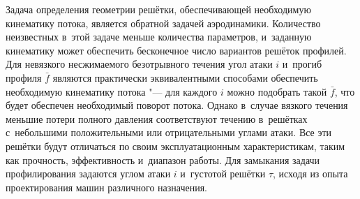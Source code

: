 Задача определения геометрии решётки, обеспечивающей необходимую кинематику потока, является обратной задачей аэродинамики.
Количество неизвестных в~этой задаче меньше количества параметров, и~заданную кинематику может обеспечить бесконечное число вариантов решёток профилей.
Для невязкого несжимаемого безотрывного течения угол атаки \(i\) и~прогиб профиля \(\bar{f}\) являются практически эквивалентными способами обеспечить необходимую кинематику потока "--- для каждого \(i\) можно подобрать такой \(\bar{f}\), что будет обеспечен необходимый поворот потока.
Однако в~случае вязкого течения меньшие потери полного давления соответствуют течению в~решётках с~небольшими положительными или отрицательными углами атаки.
Все эти решётки будут отличаться по своим эксплуатационным характеристикам, таким как прочность, эффективность и~диапазон работы.
Для замыкания задачи профилирования задаются углом атаки \(i\) и~густотой решётки \(\tau\), исходя из опыта проектирования машин различного назначения.

